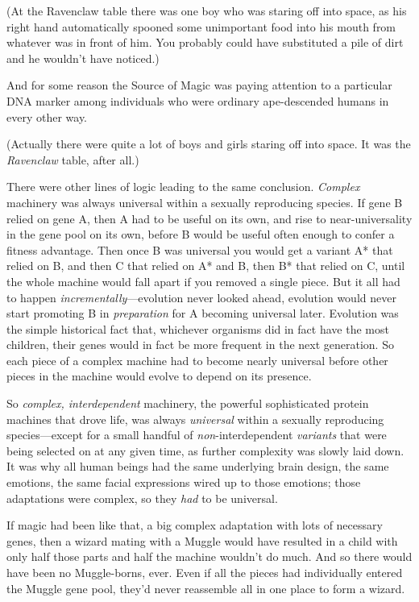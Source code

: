 (At the Ravenclaw table there was one boy who was staring off into space, as his right hand automatically spooned some unimportant food into his mouth from whatever was in front of him. You probably could have substituted a pile of dirt and he wouldn’t have noticed.)

And for some reason the Source of Magic was paying attention to a particular DNA marker among individuals who were ordinary ape-descended humans in every other way.

(Actually there were quite a lot of boys and girls staring off into space. It was the \emph{Ravenclaw} table, after all.)

There were other lines of logic leading to the same conclusion. \emph{Complex} machinery was always universal within a sexually reproducing species. If gene B relied on gene A, then A had to be useful on its own, and rise to near-universality in the gene pool on its own, before B would be useful often enough to confer a fitness advantage. Then once B was universal you would get a variant A* that relied on B, and then C that relied on A* and B, then B* that relied on C, until the whole machine would fall apart if you removed a single piece. But it all had to happen \emph{incrementally}—evolution never looked ahead, evolution would never start promoting B in \emph{preparation} for A becoming universal later. Evolution was the simple historical fact that, whichever organisms did in fact have the most children, their genes would in fact be more frequent in the next generation. So each piece of a complex machine had to become nearly universal before other pieces in the machine would evolve to depend on its presence.

So \emph{complex, interdependent} machinery, the powerful sophisticated protein machines that drove life, was always \emph{universal} within a sexually reproducing species—except for a small handful of \emph{non}-interdependent \emph{variants} that were being selected on at any given time, as further complexity was slowly laid down. It was why all human beings had the same underlying brain design, the same emotions, the same facial expressions wired up to those emotions; those adaptations were complex, so they \emph{had} to be universal.

If magic had been like that, a big complex adaptation with lots of necessary genes, then a wizard mating with a Muggle would have resulted in a child with only half those parts and half the machine wouldn’t do much. And so there would have been no Muggle-borns, ever. Even if all the pieces had individually entered the Muggle gene pool, they’d never reassemble all in one place to form a wizard.

